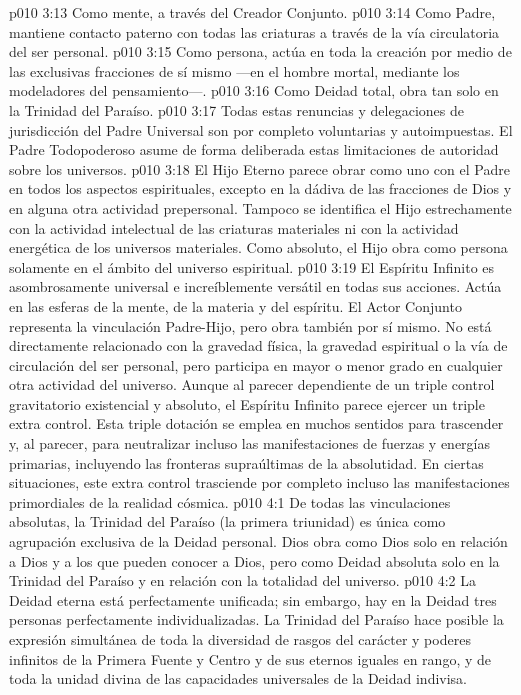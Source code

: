 \vs p010 3:13 Como mente, a través del Creador Conjunto.
\vs p010 3:14 Como Padre, mantiene contacto paterno con todas las criaturas a través de la vía circulatoria del ser personal.
\vs p010 3:15 Como persona, actúa  en toda la creación por medio de las exclusivas fracciones de sí mismo ---en el hombre mortal, mediante los modeladores del pensamiento---.
\vs p010 3:16 Como Deidad total, obra tan solo en la Trinidad del Paraíso.
\vs p010 3:17 \pc Todas estas renuncias y delegaciones de jurisdicción del Padre Universal son por completo voluntarias y autoimpuestas. El Padre Todopoderoso asume de forma deliberada estas limitaciones de autoridad sobre los universos.
\vs p010 3:18 \pc El Hijo Eterno parece obrar como uno con el Padre en todos los aspectos espirituales, excepto en la dádiva de las fracciones de Dios y en alguna otra actividad prepersonal. Tampoco se identifica el Hijo estrechamente con la actividad intelectual de las criaturas materiales ni con la actividad energética de los universos materiales. Como absoluto, el Hijo obra como persona solamente en el ámbito del universo espiritual.
\vs p010 3:19 \pc El Espíritu Infinito es asombrosamente universal e increíblemente versátil en todas sus acciones. Actúa en las esferas de la mente, de la materia y del espíritu. El Actor Conjunto representa la vinculación Padre\hyp{}Hijo, pero obra también por sí mismo. No está directamente relacionado con la gravedad física, la gravedad espiritual o la vía de circulación del ser personal, pero participa en mayor o menor grado en cualquier otra actividad del universo. Aunque al parecer dependiente de un triple control gravitatorio existencial y absoluto, el Espíritu Infinito parece ejercer un triple extra control. Esta triple dotación se emplea en muchos sentidos para trascender y, al parecer, para neutralizar incluso las manifestaciones de fuerzas y energías primarias, incluyendo las fronteras supraúltimas de la absolutidad. En ciertas situaciones, este extra control trasciende por completo incluso las manifestaciones primordiales de la realidad cósmica.
\vs p010 4:1 De todas las vinculaciones absolutas, la Trinidad del Paraíso (la primera triunidad) es única como agrupación exclusiva de la Deidad personal. Dios obra como Dios solo en relación a Dios y a los que pueden conocer a Dios, pero como Deidad absoluta solo en la Trinidad del Paraíso y en relación con la totalidad del universo.
\vs p010 4:2 \pc La Deidad eterna está perfectamente unificada; sin embargo, hay en la Deidad tres personas perfectamente individualizadas. La Trinidad del Paraíso hace posible la expresión simultánea de toda la diversidad de rasgos del carácter y poderes infinitos de la Primera Fuente y Centro y de sus eternos iguales en rango, y de toda la unidad divina de las capacidades universales de la Deidad indivisa.
